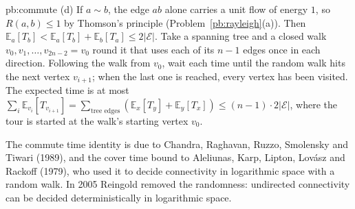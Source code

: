\begin{solution}{pb:commute}
(d) If $a\sim b$, the edge $ab$ alone carries a unit flow of energy $1$, so $R(a,b)\le1$ by Thomson's principle (Problem~\ref{pb:rayleigh}(a)). Then $\mathbb E_a[T_b]<\mathbb E_a[T_b]+\mathbb E_b[T_a]\le2|\mathcal E|$. Take a spanning tree and a closed walk
$v_0,v_1,\dots,v_{2n-2}=v_0$ round it that uses each of its $n-1$ edges once in each direction. Following the walk from $v_0$, wait each time until the
random walk hits the next vertex $v_{i+1}$; when the last one is reached, every vertex has been visited. The expected time is at most
$\sum_i\mathbb E_{v_i}[T_{v_{i+1}}]=\sum_{\text{tree edges}}(\mathbb E_x[T_y]+\mathbb E_y[T_x])\le(n-1)\cdot2|\mathcal E|$, where the tour is started at the walk's starting vertex $v_0$.

\leads The commute time identity is due to Chandra, Raghavan, Ruzzo, Smolensky and Tiwari (1989), and the cover time bound to Aleliunas,
Karp, Lipton, Lovász and Rackoff (1979), who used it to decide connectivity in logarithmic space with a random walk. In 2005 Reingold
removed the randomness: undirected connectivity can be decided deterministically in logarithmic space.
\end{solution}

